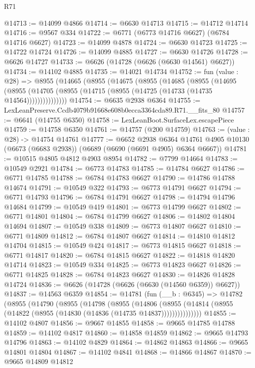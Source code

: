 \begin{lexlean}{R71}
\begin{coremodule}
@14713 := @14099 @4866
@14714 := @6630 @14713
@14715 := @14712 @14714
@14716 := @9567 @334
@14722 := @6771 (@6773 @14716 @6627) (@6784 @14716 @6627)
@14723 := @14099 @4878
@14724 := @6630 @14723
@14725 := @14722 @14724
@14726 := @14099 @4885
@14727 := @6630 @14726
@14728 := @6626 @14727
@14733 := @6626 (@14728 (@6626 (@6630 @14561) @6627))
@14734 := @14102 @4885
@14735 := @14021 @14734
@14752 := fun (value : @28) =>
  @8955
    (@14665
      (@8955
        (@14675
          (@8955
            (@14685
              (@8955
                (@14695
                  (@8955 (@14705 (@8955 (@14715 (@8955 (@14725 (@14733 (@14735 @14564)))))))))))))))
@14754 := @6635 @2938 @6364
@14755 := LexLeanPreserve.Ccdb4079b91668e608b0ecca3364cda89.R71.__fits_80
@14757 := @6641 (@14755 @6350)
@14758 := LexLeanBoot.SurfaceLex.escapePiece
@14759 := @14758 @6350
@14761 := @14757 (@200 @14759)
@14763 := (value : @28) -> @14754 @14761
@14777 := @6652
    @2938
    @6364
    @14761
    @4905
    @10130
    (@6673 (@6683 @2938))
    (@6689 (@6690 (@6691 @4905) @6364 @6667))
@14781 := @10515 @4805 @4812 @4903 @8954
@14782 := @7799 @14664
@14783 := @10549 @2921
@14784 := @6773 @14783
@14785 := @14784 @6627
@14786 := @6771 @14785
@14788 := @6784 @14783 @6627
@14790 := @14786 @14788 @14674
@14791 := @10549 @322
@14793 := @6773 @14791 @6627
@14794 := @6771 @14793
@14796 := @6784 @14791 @6627
@14798 := @14794 @14796 @14684
@14799 := @10549 @419
@14801 := @6773 @14799 @6627
@14802 := @6771 @14801
@14804 := @6784 @14799 @6627
@14806 := @14802 @14804 @14694
@14807 := @10549 @338
@14809 := @6773 @14807 @6627
@14810 := @6771 @14809
@14812 := @6784 @14807 @6627
@14814 := @14810 @14812 @14704
@14815 := @10549 @424
@14817 := @6773 @14815 @6627
@14818 := @6771 @14817
@14820 := @6784 @14815 @6627
@14822 := @14818 @14820 @14714
@14823 := @10549 @334
@14825 := @6773 @14823 @6627
@14826 := @6771 @14825
@14828 := @6784 @14823 @6627
@14830 := @14826 @14828 @14724
@14836 := @6626 (@14728 (@6626 (@6630 (@14560 @6359)) @6627))
@14837 := @14563 @6359
@14854 := @14781
    (fun (__b : @6345) =>
    @14782
      (@8955
        (@14790
          (@8955
            (@14798
              (@8955
                (@14806
                  (@8955 (@14814 (@8955 (@14822 (@8955 (@14830 (@14836 (@14735 @14837)))))))))))))))
@14855 := @14102 @4807
@14856 := @9667 @14855
@14858 := @9665 @14785 @14788
@14859 := @14102 @4817
@14860 := @14858 @14859
@14862 := @9665 @14793 @14796
@14863 := @14102 @4829
@14864 := @14862 @14863
@14866 := @9665 @14801 @14804
@14867 := @14102 @4841
@14868 := @14866 @14867
@14870 := @9665 @14809 @14812

\end{coremodule}
\end{lexlean}
